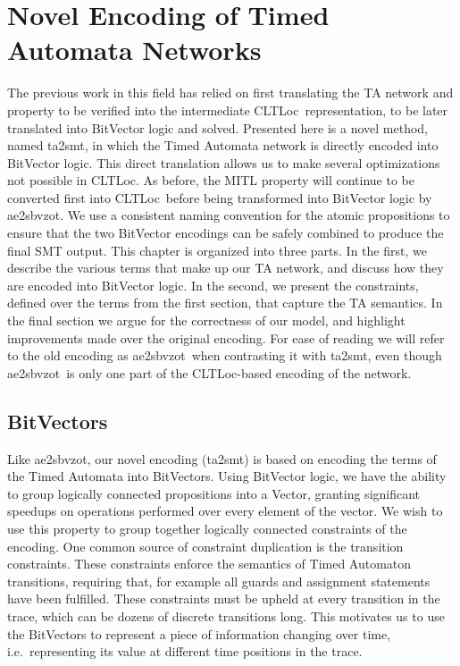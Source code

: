 \documentclass[a4paper,11pt]{report}
\theoremstyle{definition}
\newcommand{\cltloc}{CLTLoc}
\newcommand{\aez}{ae2sbvzot}
\begin{document}
\chapter{Novel Encoding of Timed Automata Networks}\label{encoding}

The previous work in this field has relied on first translating the TA network
and property to be verified into the intermediate \cltloc\ representation, to be
later translated into BitVector logic and solved. Presented here is a novel
method, named ta2smt, in which the Timed Automata network is directly encoded
into BitVector logic. This direct translation allows us to make several
optimizations not possible in \cltloc. As before, the MITL property will
continue to be converted first into \cltloc\ before being transformed into
BitVector logic by \aez. We use a consistent naming convention for the atomic
propositions to ensure that the two BitVector encodings can be safely combined
to produce the final SMT output. This chapter is organized into three parts. In
the first, we describe the various terms that make up our TA network, and
discuss how they are encoded into BitVector logic. In the second, we present the
constraints, defined over the terms from the first section, that capture the TA
semantics. In the final section we argue for the correctness of our model, and
highlight improvements made over the original encoding. For ease of reading we
will refer to the old encoding as \aez\ when contrasting it with ta2smt, even
though \aez\ is only one part of the \cltloc-based encoding of the network.

\section{BitVectors}


Like \aez, our novel encoding (ta2smt) is based on encoding the terms of the
Timed Automata into BitVectors. Using BitVector logic, we have the ability to
group logically connected propositions into a Vector, granting significant
speedups on operations performed over every element of the vector. We wish to
use this property to group together logically connected constraints of the
encoding. One common source of constraint duplication is the transition
constraints. These constraints enforce the semantics of Timed Automaton
transitions, requiring that, for example all guards and assignment statements
have been fulfilled. These constraints must be upheld at every transition in the
trace, which can be dozens of discrete transitions long. This motivates us to
use the BitVectors to represent a piece of information changing over time, i.e.\
representing its value at different time positions in the trace.
\end{document}
